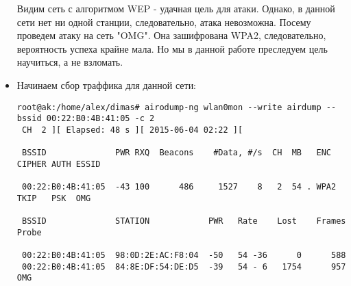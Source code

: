 \documentclass[10pt,a4paper]{article}
\begin{document}
\begin{itemize}
Видим сеть с алгоритмом WEP - удачная цель для атаки. Однако, в данной сети нет ни одной станции, следовательно, атака невозможна. Посему проведем атаку на сеть "OMG". Она зашифрована WPA2, следовательно, вероятность успеха крайне мала. Но мы в данной работе преследуем цель научиться, а не взломать.

\item Начинаем сбор траффика для данной сети:
\begin{lstlisting}
root@ak:/home/alex/dimas# airodump-ng wlan0mon --write airdump --bssid 00:22:B0:4B:41:05 -c 2
 CH  2 ][ Elapsed: 48 s ][ 2015-06-04 02:22 ][
                                                                                                                                                                                                                                            
 BSSID              PWR RXQ  Beacons    #Data, #/s  CH  MB   ENC  CIPHER AUTH ESSID
                                                                                                                                                                                                                                            
 00:22:B0:4B:41:05  -43 100      486     1527    8   2  54 . WPA2 TKIP   PSK  OMG                                                                                                                                                           
                                                                                                                                                                                                                                            
 BSSID              STATION            PWR   Rate    Lost    Frames  Probe                                                                                                                                                                  
                                                                                                                                                                                                                                            
 00:22:B0:4B:41:05  98:0D:2E:AC:F8:04  -50   54 -36      0      588                                                                                                                                                                          
 00:22:B0:4B:41:05  84:8E:DF:54:DE:D5  -39   54 - 6   1754      957  OMG   
\end{lstlisting}


\end{itemize}
\end{document}
